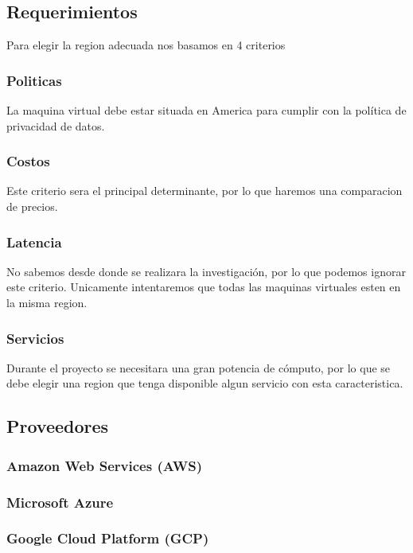 \documentclass{article}
\begin{document}
\subsection{Requerimientos}
    
Para elegir la region adecuada nos basamos en 4 criterios \cite{choosing_region}
  \subsubsection*{Politicas}
    La maquina virtual debe estar situada en America para cumplir con la política de privacidad de datos.
  \subsubsection*{Costos}
    Este criterio sera el principal determinante, por lo que haremos una comparacion de precios.
  \subsubsection*{Latencia}
    No sabemos desde donde se realizara la investigación, por lo que podemos ignorar este criterio. Unicamente intentaremos que todas las maquinas virtuales esten en la misma region.
  \subsubsection*{Servicios}
    Durante el proyecto se necesitara una gran potencia de cómputo, por lo que se debe elegir una region que tenga disponible algun servicio con esta caracteristica.

  \subsection{Proveedores}

  \subsubsection*{Amazon Web Services (AWS)}
    
    

  \subsubsection*{Microsoft Azure}
  \subsubsection*{Google Cloud Platform (GCP)}
\end{document}
